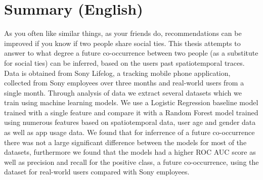 \chapter{Summary (English)}
As you often like similar things, as your friends do, recommendations can be improved if you know if two people share social ties.
This thesis attempts to answer to what degree a future co-occurrence between two people (as a substitute for social ties) can be inferred, based on the users past spatiotemporal traces. 
Data is obtained from Sony Lifelog, a tracking mobile phone application, collected from Sony employees over three months and real-world users from a single month.
Through analysis of data we extract several datasets which we train using machine learning models.
We use a Logistic Regression baseline model trained with a single feature and compare it with a Random Forest model trained using numerous features based on spatiotemporal data, user age and gender data as well as app usage data. We found that for inferrence of a future co-occurrence there was not a large significant difference between the models for most of the datasets, furthermore we found that the models had a higher ROC AUC score as well as precision and recall for the positive class, a future co-occurrence, using the dataset for real-world users compared with Sony employees.